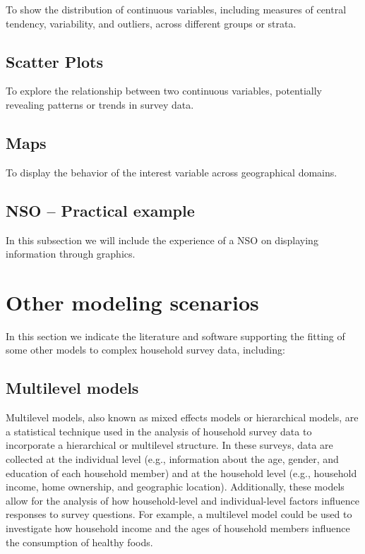 \documentclass[
  12pt,
]{book}
\begin{document}
To show the distribution of continuous variables, including measures of central tendency, variability, and outliers, across different groups or strata.

\section{Scatter Plots}\label{scatter-plots}

To explore the relationship between two continuous variables, potentially revealing patterns or trends in survey data.

\section{Maps}\label{maps}

To display the behavior of the interest variable across geographical domains.

\section{NSO -- Practical example}\label{nso-practical-example-3}

In this subsection we will include the experience of a NSO on displaying information through graphics.

\chapter{Other modeling scenarios}\label{other-modeling-scenarios}

In this section we indicate the literature and software supporting the fitting of some other models to complex household survey data, including:

\section{Multilevel models}\label{multilevel-models}

Multilevel models, also known as mixed effects models or hierarchical models, are a statistical technique used in the analysis of household survey data to incorporate a hierarchical or multilevel structure. In these surveys, data are collected at the individual level (e.g., information about the age, gender, and education of each household member) and at the household level (e.g., household income, home ownership, and geographic location). Additionally, these models allow for the analysis of how household-level and individual-level factors influence responses to survey questions. For example, a multilevel model could be used to investigate how household income and the ages of household members influence the consumption of healthy foods.
\end{document}
